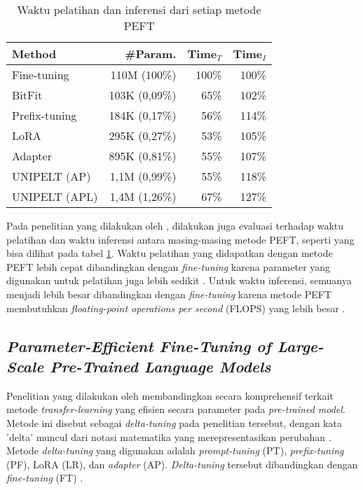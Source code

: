 \begin{table}[ht]
    \vspace{0.25cm}
    \centering
    \caption{Waktu pelatihan dan inferensi dari setiap metode PEFT \parencite{unipelt}}
    \label{table:runtime-peft}
    \begin{tabular}{lrrr}
        \toprule
        \textbf{Method} & \textbf{\#Param.} & \textbf{Time$_T$} & \textbf{Time$_I$} \\ 
        \midrule
        Fine-tuning & 110M (100\%) & 100\% & 100\% \\ 
        BitFit & 103K (0,09\%) & 65\% & 102\% \\ 
        Prefix-tuning & 184K (0,17\%) & 56\% & 114\% \\ 
        LoRA & 295K (0,27\%) & 53\% & 105\% \\ 
        Adapter & 895K (0,81\%) & 55\% & 107\% \\ 
        UNIPELT (AP) & 1,1M (0,99\%) & 55\% & 118\% \\ 
        UNIPELT (APL) & 1,4M (1,26\%) & 67\% & 127\% \\ 
        \bottomrule
    \end{tabular}
\end{table}

Pada penelitian yang dilakukan oleh \citeauthor{unipelt}, dilakukan juga evaluasi terhadap waktu pelatihan dan waktu inferensi antara masing-masing metode PEFT, seperti yang bisa dilihat pada tabel \ref{table:runtime-peft}. Waktu pelatihan yang didapatkan dengan metode PEFT lebih cepat dibandingkan dengan \textit{fine-tuning} karena parameter yang digunakan untuk pelatihan juga lebih sedikit \parencite{unipelt}. Untuk waktu inferensi, semuanya menjadi lebih besar dibandingkan dengan \textit{fine-tuning} karena metode PEFT membutuhkan \textit{floating-point operations per second} (FLOPS) yang lebih besar \parencite{unipelt}.

\subsection{\textit{Parameter-Efficient Fine-Tuning of Large-Scale
Pre-Trained Language Models}}

Penelitian yang dilakukan oleh \citeauthor{peft_on_plm} membandingkan secara komprehensif terkait metode \textit{transfer-learning} yang efisien secara parameter pada \textit{pre-trained model}. Metode ini disebut sebagai \textit{delta-tuning} pada penelitian tersebut, dengan kata 'delta' muncul dari notasi matematika yang merepresentasikan perubahan \parencite{peft_on_plm}. Metode \textit{delta-tuning} yang digunakan adalah \textit{prompt-tuning} (PT), \textit{prefix-tuning} (PF), LoRA (LR), dan \textit{adapter} (AP). \textit{Delta-tuning} tersebut  dibandingkan dengan \textit{fine-tuning} (FT) .

